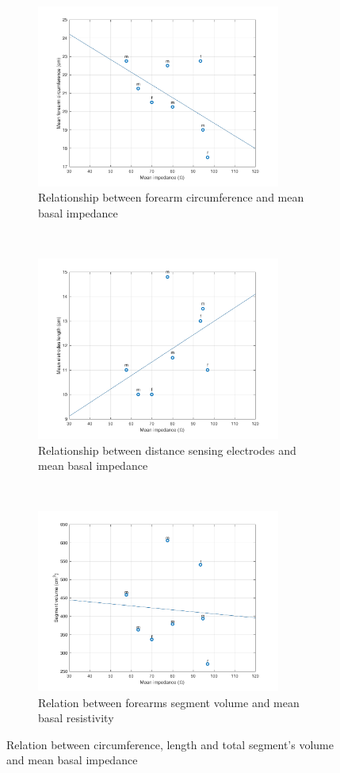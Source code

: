 \begin{figure}[t!]
	\centering
	\begin{subfigure}[t]{0.5\textwidth}
		\centering
		\includegraphics[height=6cm]{figure2a}
		\caption{Relationship between forearm circumference and mean basal impedance}
		\label{fig:C_vs_Z}
	\end{subfigure}%
	~ 
	\begin{subfigure}[t]{0.5\textwidth}
		\centering
		\includegraphics[height=6cm]{figure2b}
		\caption{Relationship between distance sensing electrodes and mean basal impedance}
		\label{fig:l_vs_Z}
	\end{subfigure}
	~ 
	\begin{subfigure}[t]{0.5\textwidth}
		\centering
		\includegraphics[height=6cm]{figure2c}
		\caption{Relation between forearms segment volume and mean basal resistivity}
		\label{fig:Ve_vs_Z}
	\end{subfigure}
	\caption{Relation between circumference, length and total segment's volume and mean basal impedance}
	\label{fig:relation_geometry_vs_impedance}
\end{figure}


